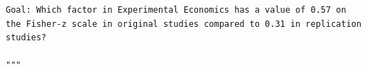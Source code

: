 \begin{verbatim}
Goal: Which factor in Experimental Economics has a value of 0.57 on the Fisher-z scale in original studies compared to 0.31 in replication studies?

"""
\end{verbatim}




